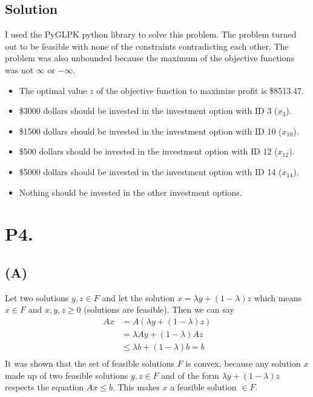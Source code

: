 \documentclass[12pt]{article}
\begin{document}
\subsection*{}

\subsection*{Solution}
I used the PyGLPK python library to solve this problem.  The problem turned out to be feasible with none of the constraints contradicting each other.  The problem was also unbounded because the maximum of the objective functions was not $\infty$ or $-\infty$.\\ 
\begin{itemize}
  \item The optimal value $z$ of the objective function to maximize profit is \$8513.47.
  \item \$3000 dollars should be invested in the investment option with ID 3 ($x_{3}$).
  \item \$1500 dollars should be invested in the investment option with ID 10 ($x_{10}$).
  \item \$500 dollars should be invested in the investment option with ID 12 ($x_{12}$).
  \item \$5000 dollars should be invested in the investment option with ID 14 ($x_{14}$).
  \item Nothing should be invested in the other investment options.
\end{itemize}
\newpage
\section*{P4.}
\subsection*{(A)}
Let two solutions $y, z \in F$ and let the solution $x = \lambda y + (1 - \lambda)z$ which means $x \in F$ and $x, y, z \geq 0$ (solutions are feasible).  Then we can say
\begin{align*}
Ax & = A(\lambda y + (1 - \lambda)z)\\
  &= \lambda Ay + (1 - \lambda)Az\\
  &\leq \lambda b + (1 - \lambda)b = b\\
\end{align*}
It was shown that the set of feasible solutions $F$ is convex, because any solution $x$ made up of two feasible solutions $y, z \in F$ and of the form $\lambda y + (1 - \lambda)z$ respects the equation $Ax \leq b$.  This makes $x$ a feasible solution $\in F$.
\end{document}
